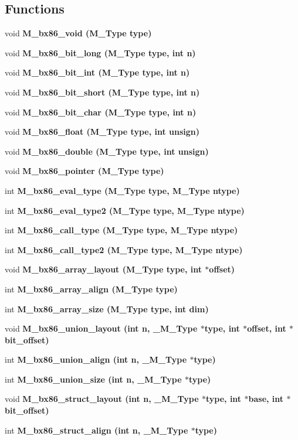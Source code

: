 \subsection*{Functions}
\begin{CompactItemize}
\item 
void \bf{M\_\-bx86\_\-void} (\bf{M\_\-Type} type)
\item 
void \bf{M\_\-bx86\_\-bit\_\-long} (\bf{M\_\-Type} type, int n)
\item 
void \bf{M\_\-bx86\_\-bit\_\-int} (\bf{M\_\-Type} type, int n)
\item 
void \bf{M\_\-bx86\_\-bit\_\-short} (\bf{M\_\-Type} type, int n)
\item 
void \bf{M\_\-bx86\_\-bit\_\-char} (\bf{M\_\-Type} type, int n)
\item 
void \bf{M\_\-bx86\_\-float} (\bf{M\_\-Type} type, int unsign)
\item 
void \bf{M\_\-bx86\_\-double} (\bf{M\_\-Type} type, int unsign)
\item 
void \bf{M\_\-bx86\_\-pointer} (\bf{M\_\-Type} type)
\item 
int \bf{M\_\-bx86\_\-eval\_\-type} (\bf{M\_\-Type} type, \bf{M\_\-Type} ntype)
\item 
int \bf{M\_\-bx86\_\-eval\_\-type2} (\bf{M\_\-Type} type, \bf{M\_\-Type} ntype)
\item 
int \bf{M\_\-bx86\_\-call\_\-type} (\bf{M\_\-Type} type, \bf{M\_\-Type} ntype)
\item 
int \bf{M\_\-bx86\_\-call\_\-type2} (\bf{M\_\-Type} type, \bf{M\_\-Type} ntype)
\item 
void \bf{M\_\-bx86\_\-array\_\-layout} (\bf{M\_\-Type} type, int $\ast$offset)
\item 
int \bf{M\_\-bx86\_\-array\_\-align} (\bf{M\_\-Type} type)
\item 
int \bf{M\_\-bx86\_\-array\_\-size} (\bf{M\_\-Type} type, int dim)
\item 
void \bf{M\_\-bx86\_\-union\_\-layout} (int n, \bf{\_\-M\_\-Type} $\ast$type, int $\ast$offset, int $\ast$bit\_\-offset)
\item 
int \bf{M\_\-bx86\_\-union\_\-align} (int n, \bf{\_\-M\_\-Type} $\ast$type)
\item 
int \bf{M\_\-bx86\_\-union\_\-size} (int n, \bf{\_\-M\_\-Type} $\ast$type)
\item 
void \bf{M\_\-bx86\_\-struct\_\-layout} (int n, \bf{\_\-M\_\-Type} $\ast$type, int $\ast$base, int $\ast$bit\_\-offset)
\item 
int \bf{M\_\-bx86\_\-struct\_\-align} (int n, \bf{\_\-M\_\-Type} $\ast$type)

\end{CompactItemize}
